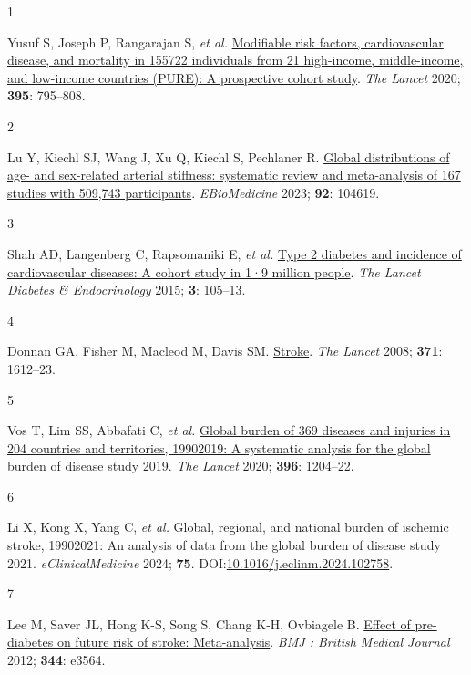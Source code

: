 \documentclass[
  a4paper,
  headsepline=true,
  open=any]{scrbook}
\newlength{\cslhangindent}
\newlength{\csllabelwidth}
\newlength{\cslentryspacingunit} %
\newenvironment{CSLReferences}[2] %
 {%
  \setlength{\parindent}{0pt}
  \ifodd #1
  \let\oldpar\par
  \def\par{\hangindent=\cslhangindent\oldpar}
  \fi
  \setlength{\parskip}{#2\cslentryspacingunit}
 }%
 {}
\newcommand{\CSLLeftMargin}[1]{\parbox[t]{\csllabelwidth}{#1}}
\newcommand{\CSLRightInline}[1]{\parbox[t]{\linewidth - \csllabelwidth}{#1}\break}
\begin{document}
\hypertarget{refs}{}
\begin{CSLReferences}{0}{0}
\leavevmode{}%
\CSLLeftMargin{1 }%
\CSLRightInline{Yusuf S, Joseph P, Rangarajan S, \emph{et al.}
\href{https://doi.org/10.1016/S0140-6736(19)32008-2}{Modifiable risk
factors, cardiovascular disease, and mortality in 155{\hphantom{,}}722
individuals from 21 high-income, middle-income, and low-income countries
(PURE): A prospective cohort study}. \emph{The Lancet} 2020;
\textbf{395}: 795--808.}

\leavevmode{}%
\CSLLeftMargin{2 }%
\CSLRightInline{Lu Y, Kiechl SJ, Wang J, Xu Q, Kiechl S, Pechlaner R.
\href{https://doi.org/10.1016/j.ebiom.2023.104619}{Global distributions
of age- and sex-related arterial stiffness: systematic review and
meta-analysis of 167 studies with 509,743 participants}.
\emph{EBioMedicine} 2023; \textbf{92}: 104619.}

\leavevmode{}%
\CSLLeftMargin{3 }%
\CSLRightInline{Shah AD, Langenberg C, Rapsomaniki E, \emph{et al.}
\href{https://doi.org/10.1016/S2213-8587(14)70219-0}{Type 2 diabetes and
incidence of cardiovascular diseases: A cohort study in 1·9 million
people}. \emph{The Lancet Diabetes \& Endocrinology} 2015; \textbf{3}:
105--13.}

\leavevmode{}%
\CSLLeftMargin{4 }%
\CSLRightInline{Donnan GA, Fisher M, Macleod M, Davis SM.
\href{https://doi.org/10.1016/S0140-6736(08)60694-7}{Stroke}. \emph{The
Lancet} 2008; \textbf{371}: 1612--23.}

\leavevmode{}%
\CSLLeftMargin{5 }%
\CSLRightInline{Vos T, Lim SS, Abbafati C, \emph{et al.}
\href{https://doi.org/10.1016/S0140-6736(20)30925-9}{Global burden of
369 diseases and injuries in 204 countries and territories,
1990{\textendash}2019: A systematic analysis for the global burden of
disease study 2019}. \emph{The Lancet} 2020; \textbf{396}: 1204--22.}

\leavevmode{}%
\CSLLeftMargin{6 }%
\CSLRightInline{Li X, Kong X, Yang C, \emph{et al.} Global, regional,
and national burden of ischemic stroke, 1990{\textendash}2021: An
analysis of data from the global burden of disease study 2021.
\emph{eClinicalMedicine} 2024; \textbf{75}.
DOI:\href{https://doi.org/10.1016/j.eclinm.2024.102758}{10.1016/j.eclinm.2024.102758}.}

\leavevmode{}%
\CSLLeftMargin{7 }%
\CSLRightInline{Lee M, Saver JL, Hong K-S, Song S, Chang K-H, Ovbiagele
B. \href{https://doi.org/10.1136/bmj.e3564}{Effect of pre-diabetes on
future risk of stroke: Meta-analysis}. \emph{BMJ : British Medical
Journal} 2012; \textbf{344}: e3564.}


\end{CSLReferences}
\end{document}
